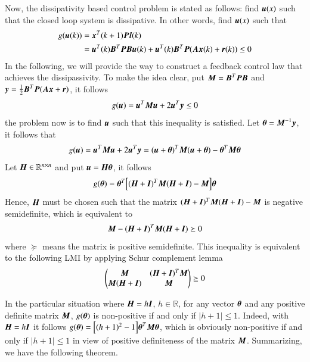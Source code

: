 \documentclass[preprint,authoryear,12pt]{elsarticle}
\renewcommand{\vec}[1]{\mbox{\boldmath$#1$}}
\newcommand{\mat}[1]{\mbox{\boldmath$#1$}}
\begin{document}
Now, the dissipativity based control problem is stated as follows:
find $\vec{u}(x)$ such that the closed loop system is dissipative. In
other words, find $\vec{u}(x)$ such that
\begin{align*}
g(\vec{u}(k))&=\vec{x}^T(k+1)\mat{P}\vec{l}(k)\\
&=\vec{u}^T(k)\mat{B}^T\mat{P}\mat{B}\vec{u}(k)
+\vec{u}^T(k)\mat{B}^T\mat{P}(\mat{A}\vec{x}(k)+\vec{r}(k))\leq 0
\end{align*}
In the following, we will provide the way to construct a feedback
control law that achieves the dissipassivity. To make the idea clear, 
put $\mat{M}=\mat{B}^T\mat{P}\mat{B}$ and
$\vec{y}=\frac{1}{2}\mat{B}^T\mat{P}(\mat{A}\vec{x}+\vec{r})$, it
follows
\begin{equation}\label{pbc}
g(\vec{u})=\vec{u}^T\mat{M}\vec{u}+2\vec{u}^T\vec{y}\leq0
\end{equation}
the problem now is to find $\vec{u}$ such that this inequality is
satisfied. Let $\vec{\theta} =\mat{M}^{-1}\vec{y}$, it follows
that
$$g(\vec{u})=\vec{u}^T\mat{M}\vec{u}+2\vec{u}^T\vec{y}=(\vec{u}
+\vec{\theta})^T \mat{M} (\vec{u}+\vec{\theta}) -\vec{\theta}^T
\mat{M}\vec{\theta}$$
Let $\mat{H}\in\mathbb{R}^{n\times n}$ and put
$\vec{u}=\mat{H}\vec{\theta}$, it follows
$$g(\vec{\theta})= \vec{\theta}^T\Bigl[(\mat{H}+\mat{I})^T \mat{M}
(\mat{H}+\mat{I})-\mat{M}\Bigr]\vec{\theta}
$$
Hence, $\mat{H}$ must be chosen such that the matrix
$(\mat{H}+\mat{I})^T \mat{M} (\mat{H}+\mat{I})-\mat{M}$ is negative
semidefinite, which is equivalent to
$$\mat{M}-(\mat{H}+\mat{I})^T \mat{M} (\mat{H}+\mat{I})\succeq 0$$
where $\succeq$ means the matrix is positive semidefinite.
This inequality is equivalent to the following LMI by applying Schur
complement lemma \citep{boyd_linear_1994}
$$\begin{pmatrix}
\mat{M}& (\mat{H}+\mat{I})^T \mat{M} \\
\mat{M} (\mat{H}+\mat{I})  & \mat{M}
\end{pmatrix}\succeq 0$$

In the particular situation where $\mat{H}=h\mat{I}$, $h\in
\mathbb{R}$,
for any vector $\vec{\theta}$ and any positive definite matrix
$\mat{M}$, $g(\vec{\theta})$ is non-positive if and only if $|h+1|\leq
1$. Indeed, with $\mat{H}=h\mat{I}$ it follows
$g(\vec{\theta})=\Bigl[(h+1)^2-1\Bigr]
\vec{\theta}^T\mat{M}\vec{\theta}$, which is obviously non-positive if
and only if $|h+1|\leq 1$ in view of positive definiteness of the
matrix $\mat{M}$.
Summarizing, we have the following theorem. 
\end{document}
